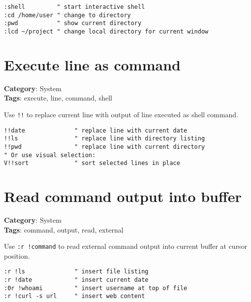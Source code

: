 {{{{{{{{{{{{{{\begin{Exa*}{}
\begin{Verbatim}[fontsize=\footnotesize, breaklines, breakanywhere]
:shell         " start interactive shell
:cd /home/user " change to directory
:pwd           " show current directory
:lcd ~/project " change local directory for current window
\end{Verbatim}
\end{Exa*}

\section{Execute line as command}

\textbf{Category}: System\\ \textbf{Tags}: execute, line, command, shell
\vspace{0.5cm}

Use {\footnotesize \Verb§!!§} to replace current line with output of line executed as shell command.

\begin{Exa*}{}
\begin{Verbatim}[fontsize=\footnotesize, breaklines, breakanywhere]
!!date              " replace line with current date
!!ls                " replace line with directory listing
!!pwd               " replace line with current directory
" Or use visual selection:
V!!sort             " sort selected lines in place
\end{Verbatim}
\end{Exa*}

\section{Read command output into buffer}

\textbf{Category}: System\\ \textbf{Tags}: command, output, read, external
\vspace{0.5cm}

Use {\footnotesize \Verb§:r !command§} to read external command output into current buffer at cursor position.

\begin{Exa*}{}
\begin{Verbatim}[fontsize=\footnotesize, breaklines, breakanywhere]
:r !ls              " insert file listing
:r !date            " insert current date
:0r !whoami         " insert username at top of file
:r !curl -s url     " insert web content
\end{Verbatim}
\end{Exa*}

}}}}}}}}}}}}}}
